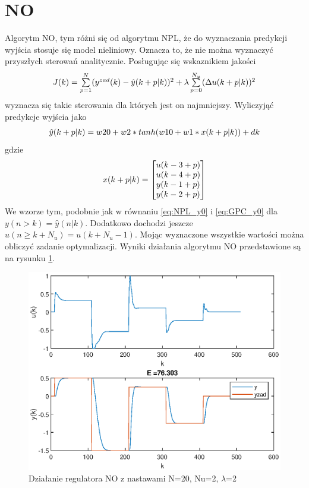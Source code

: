 	\section{NO}
		\label{sec:NO}
		Algorytm NO, tym różni się od algorytmu NPL, że do wyznaczania predykcji wyjścia stosuje się model nieliniowy. Oznacza to, że nie można wyznaczyć przyszłych sterowań analitycznie. Posługując się wskaznikiem jakości
		\begin{equation}
		\begin{tabular}{l}
		$J(k) = \sum\limits_{p=1}^{N}(y^{zad}(k)-\hat{y}(k+p|k))^2+\lambda\sum\limits_{p=0}^{N_u}(\Delta u(k+p|k))^2$
		\end{tabular}
		\label{eq:wsk_jakosc}
		\end{equation}
		wyznacza się takie sterowania dla których jest on najmniejszy.
		Wyliczyjąć predykcje wyjścia jako
		\begin{equation}
		\begin{tabular}{l}
		$\hat{y}(k+p|k)=w20 + w2*tanh(w10+w1*x(k+p|k))+dk$
		\end{tabular}
		\label{eq:NO_wyjscie}
		\end{equation}
		gdzie
		\begin{equation}
		\begin{tabular}{l}
		$x(k+p|k)=\begin{bmatrix}u(k-3+p)\\u(k-4+p)\\y(k-1+p)\\y(k-2+p)\end{bmatrix}$
		\end{tabular}
		\label{eq:NO_wesn}
		\end{equation}
		We wzorze tym, podobnie jak w równaniu \ref{eq:NPL_y0} i \ref{eq:GPC_y0} dla $y(n>k)=\hat{y}(n|k)$. Dodatkowo dochodzi jeszcze $u(n \geqslant k+N_u)=u(k+N_u-1)$. Mojąc wyznaczone wszystkie wartości można obliczyć zadanie optymalizacji. Wyniki działania algorytmu NO przedstawione są na rysunku \ref{fig:NO}.
		\begin{figure}[h!]
			\centering
			\includegraphics[width=\linewidth]{img/NO.eps}
			\caption{Działanie regulatora NO z nastawami N=20, Nu=2, $\lambda$=2}
			\label{fig:NO}
		\end{figure}
